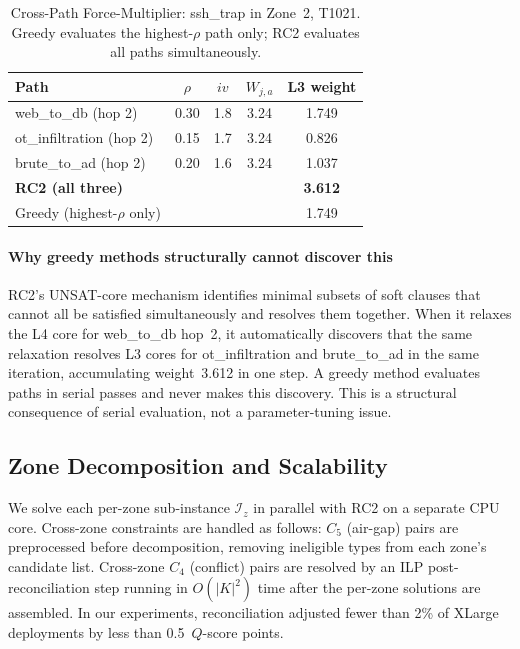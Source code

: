 \documentclass[journal]{IEEEtran}
\newcommand{\qscore}{$Q$-score}
\begin{document}
\begin{table}[!htb]
\caption{Cross-Path Force-Multiplier: ssh\_trap in Zone~2, T1021.
  Greedy evaluates the highest-$\rho$ path only; RC2 evaluates all
  paths simultaneously.}
\label{tab:forcemult}
\centering
\renewcommand{\arraystretch}{1.2}
\begin{tabular}{lcccc}
\toprule
Path & $\rho$ & $iv$ & $W_{j,a}$ & L3 weight \\
\midrule
web\_to\_db (hop 2)       & 0.30 & 1.8 & 3.24 & 1.749 \\
ot\_infiltration (hop 2)  & 0.15 & 1.7 & 3.24 & 0.826 \\
brute\_to\_ad (hop 2)     & 0.20 & 1.6 & 3.24 & 1.037 \\
\midrule
\textbf{RC2 (all three)} & & & & \textbf{3.612} \\
Greedy (highest-$\rho$ only) & & & & 1.749 \\
\bottomrule
\end{tabular}
\end{table}

\paragraph{Why greedy methods structurally cannot discover this}
RC2's UNSAT-core mechanism identifies minimal subsets of soft clauses
that cannot all be satisfied simultaneously and resolves them
together. When it relaxes the L4 core for web\_to\_db hop~2, it
automatically discovers that the same relaxation resolves L3 cores
for ot\_infiltration and brute\_to\_ad in the same iteration,
accumulating weight~3.612 in one step. A greedy method evaluates
paths in serial passes and never makes this discovery. This is a
structural consequence of serial evaluation, not a parameter-tuning
issue.

\subsection{Zone Decomposition and Scalability}
\label{sec:solver}

We solve each per-zone sub-instance $\mathcal{I}_z$ in parallel
with RC2 on a separate CPU core. Cross-zone constraints are handled
as follows: $C_5$ (air-gap) pairs are preprocessed before
decomposition, removing ineligible types from each zone's candidate
list. Cross-zone $C_4$ (conflict) pairs are resolved by an ILP
post-reconciliation step running in $O(|K|^2)$ time after the
per-zone solutions are assembled. In our experiments, reconciliation
adjusted fewer than 2\% of XLarge deployments by less than
0.5~\qscore{} points.
\end{document}
